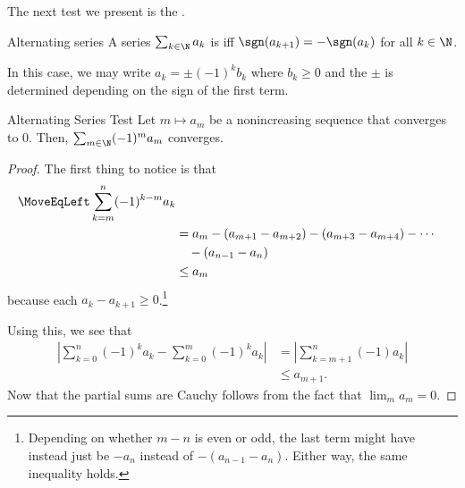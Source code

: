 The next test we present is the .
\begin{dfn}{Alternating series}{}
A series $\sum _{k\in \N}a_k$ is  iff $\sgn (a_{k+1})=-\sgn (a_k)$ for all $k\in \N$.
\begin{rmk}
In this case, we may write $a_k=\pm (-1)^kb_k$ where $b_k\geq 0$ and the $\pm$ is determined depending on the sign of the first term.
\end{rmk}
\end{dfn}
\begin{prp}{Alternating Series Test}{}
Let $m\mapsto a_m$ be a nonincreasing sequence that converges to $0$.  Then, $\sum _{m\in \N}(-1)^ma_m$ converges.
\begin{proof}
The first thing to notice is that
\begin{equation*}
\begin{split}
\MoveEqLeft
\sum _{k=m}^n(-1)^{k-m}a_k \\
& =a_m-(a_{m+1}-a_{m+2})-(a_{m+3}-a_{m+4})-\cdots \\ & \quad -(a_{n-1}-a_n) \\
& \leq a_m
\end{split}
\end{equation*}
because each $a_k-a_{k+1}\geq 0$.\footnote{Depending on whether $m-n$ is even or odd, the last term might have instead just be $-a_n$ instead of $-(a_{n-1}-a_n)$.  Either way, the same inequality holds.}

Using this, we see that
\begin{equation}
\begin{split}
\left| \sum _{k=0}^n(-1)^ka_k-\sum _{k=0}^m(-1)^ka_k\right| & =\left| \sum _{k=m+1}^n(-1)a_k\right| \\
& \leq a_{m+1}.
\end{split}
\end{equation}
Now that the partial sums are Cauchy follows from the fact that $\lim _ma_m=0$.
\end{proof}
\end{prp}
